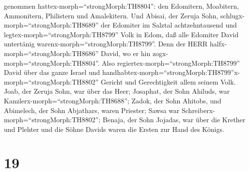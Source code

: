 genommen hattex-morph=``strongMorph:TH8804'': den Edomitern, Moabitern,
Ammonitern, Philistern und Amalekitern.  Und Abisai, der
Zeruja Sohn, schlugx-morph=``strongMorph:TH8689'' der Edomiter im
Salztal achtzehntausend  und
legtex-morph=``strongMorph:TH8799'' Volk in Edom, daß alle Edomiter
David untertänig warenx-morph=``strongMorph:TH8799''. Denn der HERR
halfx-morph=``strongMorph:TH8686'' David, wo er hin
zogx-morph=``strongMorph:TH8804''.  Also
regiertex-morph=``strongMorph:TH8799'' David über das ganze Israel und
handhabtex-morph=``strongMorph:TH8799''x-morph=``strongMorph:TH8802''
Gericht und Gerechtigkeit allem seinem Volk.  Joab, der
Zeruja Sohn, war über das Heer; Josaphat, der Sohn Ahiluds, war
Kanzlerx-morph=``strongMorph:TH8688'';  Zadok, der Sohn
Ahitobs, und Abimelech, der Sohn Abjathars, waren Priester; Sawsa war
Schreiberx-morph=``strongMorph:TH8802'';  Benaja, der Sohn
Jojadas, war über die Krether und Plehter und die Söhne Davids waren die
Ersten zur Hand des Königs.

\hypertarget{section-18}{%
\section{19}\label{section-18}}

